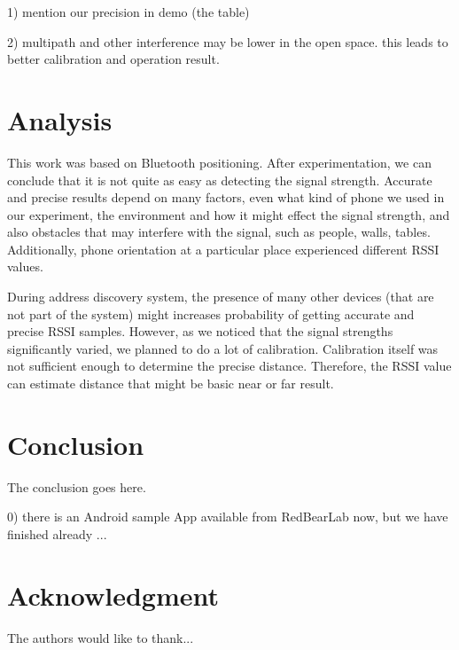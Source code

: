 \documentclass[conference,a4paper]{../../sty/IEEEtran}
\begin{document}
1) mention our precision in demo (the table)

2) multipath and other interference may be lower in the open space. this leads to better calibration and operation result.

\section{Analysis}

This work was based on Bluetooth positioning. After experimentation, we can conclude that it is not quite as easy as detecting the signal strength. Accurate and precise results depend on many factors, even what kind of phone we used in our experiment, the environment and how it might effect the signal strength, and also obstacles that may interfere with the signal, such as people, walls, tables. Additionally, phone orientation at a particular place experienced different RSSI values.

During address discovery system, the presence of many other devices (that are not part of the system) might 
increases probability of getting accurate and precise RSSI samples. However, as we noticed that the signal strengths significantly varied, we planned to do a lot of calibration. Calibration itself was not sufficient enough to determine the precise distance. Therefore, the RSSI value can estimate distance that might be basic near or far result. 

\section{Conclusion}
The conclusion goes here.

0) there is an Android sample App available from RedBearLab now, but we have finished already ...




\section*{Acknowledgment}


The authors would like to thank...\cite{IEEEhowto:IEEEtranpage}





\nocite*{}


\end{document}
